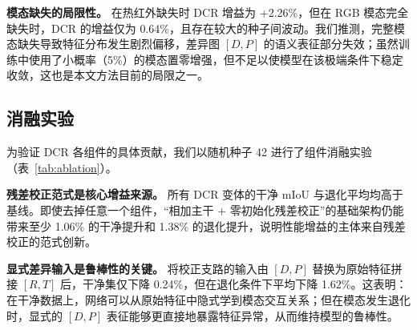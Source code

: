 \documentclass[10pt,conference]{IEEEtran}
\begin{document}
\textbf{模态缺失的局限性。} 在热红外缺失时 DCR 增益为 +2.26\%，但在 RGB 模态完全缺失时，DCR 的增益仅为 0.64\%，且存在较大的种子间波动。我们推测，完整模态缺失导致特征分布发生剧烈偏移，差异图 \([D, P]\) 的语义表征部分失效；虽然训练中使用了小概率（5\%）的模态置零增强，但不足以使模型在该极端条件下稳定收敛，这也是本文方法目前的局限之一。

\begin{table}[t]
\centering
\caption{七种模拟退化条件下的测试集 mIoU（\%，三种子均值）。}
\label{tab:robustness}
\end{table}

\subsection{消融实验}

为验证 DCR 各组件的具体贡献，我们以随机种子 42 进行了组件消融实验（表~\ref{tab:ablation}）。

\textbf{残差校正范式是核心增益来源。} 所有 DCR 变体的干净 mIoU 与退化平均均高于基线。即使去掉任意一个组件，“相加主干 + 零初始化残差校正”的基础架构仍能带来至少 1.06\% 的干净提升和 1.38\% 的退化提升，说明性能增益的主体来自残差校正的范式创新。

\textbf{显式差异输入是鲁棒性的关键。} 将校正支路的输入由 \([D, P]\) 替换为原始特征拼接 \([R, T]\) 后，干净集仅下降 0.24\%，但在退化条件下平均下降 1.62\%。这表明：在干净数据上，网络可以从原始特征中隐式学到模态交互关系；但在模态发生退化时，显式的 \([D, P]\) 表征能够更直接地暴露特征异常，从而维持模型的鲁棒性。
\end{document}
